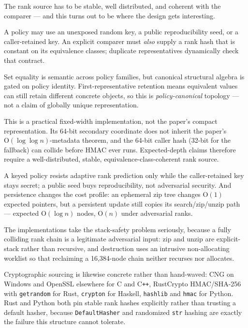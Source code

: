 \documentclass[11pt,twoside,openright]{book}
\newcommand{\code}[1]{\texorpdfstring{\textcolor{d7ink}{\texttt{#1}}}{#1}}
\newcommand{\term}[1]{\textit{#1}}
\newcommand{\bigoh}[1]{$\mathrm{O}(#1)$}
\begin{document}
The rank source has to be stable, well distributed, and coherent with the
comparer --- and this turns out to be where the design gets interesting.

\begin{contractbox}
A policy may use an unexposed random key, a public reproducibility seed, or a
caller-retained key. An explicit comparer must \emph{also} supply a rank hash
that is constant on its equivalence classes; duplicate representatives
dynamically check that contract.

Set equality is semantic across policy families, but canonical structural
algebra is gated on policy identity. First-representative retention means
equivalent values can still retain different concrete objects, so this is
\term{policy-canonical} topology --- not a claim of globally unique
representation.
\end{contractbox}

\begin{caveatbox}
This is a practical fixed-width implementation, not the paper's compact
representation. Its 64-bit secondary coordinate does not inherit the paper's
\bigoh{\log \log n}-metadata theorem, and the 64-bit caller hash (32-bit for the
fallback) can collide before HMAC ever runs. Expected-depth claims therefore
require a well-distributed, stable, equivalence-class-coherent rank source.

A keyed policy resists adaptive rank prediction only while the caller-retained
key stays secret; a public seed buys reproducibility, not adversarial security.
And persistence changes the cost profile: an ephemeral zip tree changes
\bigoh{1} expected pointers, but a persistent update still copies its
search/zip/unzip path --- expected \bigoh{\log n} nodes, \bigoh{n} under
adversarial ranks.
\end{caveatbox}

The implementations take the stack-safety problem seriously, because a fully
colliding rank chain is a legitimate adversarial input: zip and unzip are
explicit-stack rather than recursive, and destruction uses an intrusive
non-allocating worklist so that reclaiming a 16{,}384-node chain neither
recurses nor allocates.

Cryptographic sourcing is likewise concrete rather than hand-waved: CNG on
Windows and OpenSSL elsewhere for C and C\texttt{++}, RustCrypto HMAC/SHA-256
with \code{getrandom} for Rust, \code{crypton} for Haskell, \code{hashlib} and
\code{hmac} for Python. Rust and Python both pin stable rank hashes explicitly
rather than trusting a default hasher, because \code{DefaultHasher} and
randomized \code{str} hashing are exactly the failure this structure cannot
tolerate.
\end{document}
